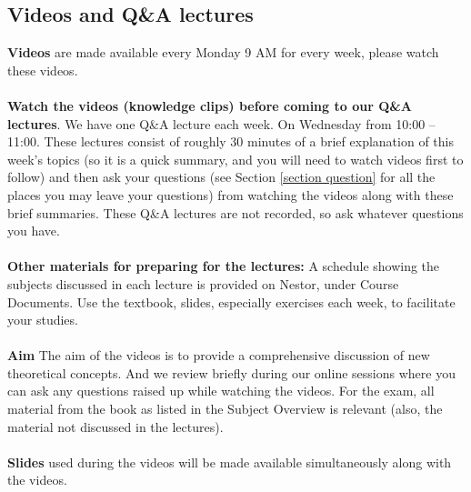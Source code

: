 \documentclass[openany]{article}
\begin{document}
\subsection{Videos and Q\&A lectures}
\textbf{Videos} are made available every Monday 9 AM for every week, please watch these videos. \\~\\
\textbf{Watch the videos (knowledge clips) before coming to our Q\&A lectures}. We have one Q\&A lecture each week. On Wednesday from 10:00 – 11:00. These lectures consist of roughly 30
minutes of a brief explanation of this week’s topics (so it is a quick summary, and you will need to watch videos first to follow) and then ask your questions (see Section \ref{section question} for all the places you may leave your questions) from watching the videos along with these brief summaries. These Q\&A lectures are not recorded, so ask whatever questions you have.\\~\\ 
\textbf{Other materials for preparing for the lectures:} A schedule showing the subjects discussed in each lecture is provided on Nestor, under Course Documents. Use the textbook, slides, especially exercises each week, to facilitate your studies. \\~\\
\textbf{Aim} The aim of the videos is to provide a comprehensive discussion of new
theoretical concepts. And we review briefly during our online sessions where you can ask any questions raised up while watching the videos. For the exam, all material from the book as listed in the Subject Overview is relevant (also, the material not discussed in
the lectures).\\~\\
\textbf{Slides} used during the videos will be made available simultaneously along with the videos. 
\end{document}

